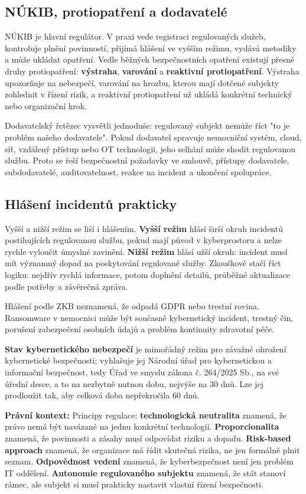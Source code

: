 \documentclass[11pt,a4paper]{article}
\newcommand{\pravobox}[1]{\begin{tcolorbox}[breakable,enhanced,colback=yellow!18,colframe=yellow!45!black,boxrule=0pt,arc=1mm,left=5pt,right=5pt,top=5pt,bottom=5pt,before skip=6pt,after skip=6pt]\textbf{Právní kontext:} #1\end{tcolorbox}}
\begin{document}
\subsection*{NÚKIB, protiopatření a dodavatelé}
NÚKIB je hlavní regulátor. V praxi vede registraci regulovaných služeb, kontroluje plnění povinností, přijímá hlášení ve vyšším režimu, vydává metodiky a může ukládat opatření. Vedle běžných bezpečnostních opatření existují přesné druhy protiopatření: \textbf{výstraha}, \textbf{varování} a \textbf{reaktivní protiopatření}. Výstraha upozorňuje na nebezpečí, varování na hrozbu, kterou mají dotčené subjekty zohlednit v řízení rizik, a reaktivní protiopatření už ukládá konkrétní technický nebo organizační krok.

Dodavatelský řetězec vysvětli jednoduše: regulovaný subjekt nemůže říct "to je problém našeho dodavatele". Pokud dodavatel spravuje nemocniční systém, cloud, síť, vzdálený přístup nebo OT technologii, jeho selhání může shodit regulovanou službu. Proto se řeší bezpečnostní požadavky ve smlouvě, přístupy dodavatele, subdodavatelé, auditovatelnost, reakce na incident a ukončení spolupráce.

\subsection*{Hlášení incidentů prakticky}
Vyšší a nižší režim se liší i hlášením. \textbf{Vyšší režim} hlásí širší okruh incidentů postihujících regulovanou službu, pokud mají původ v kyberprostoru a nelze rychle vyloučit úmyslné zavinění. \textbf{Nižší režim} hlásí užší okruh: incident musí mít významný dopad na poskytování regulované služby. Zkouškově stačí říct logiku: nejdřív rychlá informace, potom doplnění detailů, průběžné aktualizace podle potřeby a závěrečná zpráva.

Hlášení podle ZKB neznamená, že odpadá GDPR nebo trestní rovina. Ransomware v nemocnici může být současně kybernetický incident, trestný čin, porušení zabezpečení osobních údajů a problém kontinuity zdravotní péče.

\textbf{Stav kybernetického nebezpečí} je mimořádný režim pro závažné ohrožení kybernetické bezpečnosti; vyhlašuje jej Národní úřad pro kybernetickou a informační bezpečnost, tedy Úřad ve smyslu zákona č. 264/2025 Sb., na své úřední desce, a to na nezbytně nutnou dobu, nejvýše na 30 dnů. Lze jej prodloužit tak, aby celková doba nepřekročila 60 dnů.

\pravobox{Principy regulace: \textbf{technologická neutralita} znamená, že právo nemá být navázané na jednu konkrétní technologii. \textbf{Proporcionalita} znamená, že povinnosti a zásahy musí odpovídat riziku a dopadu. \textbf{Risk-based approach} znamená, že organizace má řídit skutečná rizika, ne jen formálně plnit seznam. \textbf{Odpovědnost vedení} znamená, že kyberbezpečnost není jen problém IT oddělení. \textbf{Autonomie regulovaného subjektu} znamená, že stát stanoví rámec, ale subjekt si musí prakticky nastavit vlastní řízení bezpečnosti.}
\end{document}
